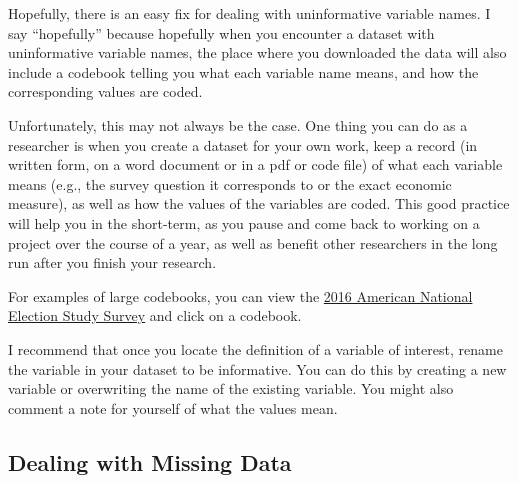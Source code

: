 \documentclass[
  letterpaper,
  DIV=11,
  numbers=noendperiod]{scrreprt}
\newenvironment{Shaded}{\begin{snugshade}}{\end{snugshade}}
\newcommand{\DecValTok}[1]{\textcolor[rgb]{0.68,0.00,0.00}{#1}}
\newcommand{\DocumentationTok}[1]{\textcolor[rgb]{0.37,0.37,0.37}{\textit{#1}}}
\newcommand{\FunctionTok}[1]{\textcolor[rgb]{0.28,0.35,0.67}{#1}}
\newcommand{\NormalTok}[1]{\textcolor[rgb]{0.00,0.23,0.31}{#1}}
\newcommand{\OtherTok}[1]{\textcolor[rgb]{0.00,0.23,0.31}{#1}}
\newcommand{\SpecialCharTok}[1]{\textcolor[rgb]{0.37,0.37,0.37}{#1}}
\newcommand{\StringTok}[1]{\textcolor[rgb]{0.13,0.47,0.30}{#1}}
\begin{document}
Hopefully, there is an easy fix for dealing with uninformative variable
names. I say ``hopefully'' because hopefully when you encounter a
dataset with uninformative variable names, the place where you
downloaded the data will also include a codebook telling you what each
variable name means, and how the corresponding values are coded.

Unfortunately, this may not always be the case. One thing you can do as
a researcher is when you create a dataset for your own work, keep a
record (in written form, on a word document or in a pdf or code file) of
what each variable means (e.g., the survey question it corresponds to or
the exact economic measure), as well as how the values of the variables
are coded. This good practice will help you in the short-term, as you
pause and come back to working on a project over the course of a year,
as well as benefit other researchers in the long run after you finish
your research.

For examples of large codebooks, you can view the
\href{https://electionstudies.org/data-center/2016-time-series-study/}{2016
American National Election Study Survey} and click on a codebook.

I recommend that once you locate the definition of a variable of
interest, rename the variable in your dataset to be informative. You can
do this by creating a new variable or overwriting the name of the
existing variable. You might also comment a note for yourself of what
the values mean.

\begin{Shaded}
\end{Shaded}

\hypertarget{dealing-with-missing-data}{%
\subsection{Dealing with Missing Data}\label{dealing-with-missing-data}}
\end{document}

